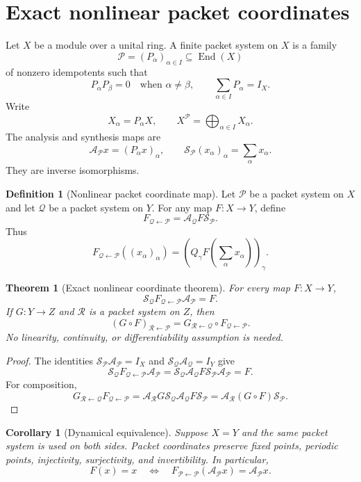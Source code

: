 \documentclass[11pt,a4paper]{article}
\newtheorem{theorem}{Theorem}[section]
\theoremstyle{plain}
\newtheorem{corollary}[corollary]{Corollary}
\theoremstyle{definition}
\newtheorem{definition}[definition]{Definition}
\theoremstyle{remark}
\newcommand{\End}{\operatorname{End}}
\newcommand{\Acal}{\mathcal A}
\newcommand{\Pcal}{\mathcal P}
\newcommand{\Qcal}{\mathcal Q}
\newcommand{\Rcal}{\mathcal R}
\newcommand{\Scal}{\mathcal S}
\begin{document}
\section{Exact nonlinear packet coordinates}\label{sec:nonlinear_coordinates}

Let $X$ be a module over a unital ring.  A finite packet system on $X$ is a family
\[
\Pcal=(P_\alpha)_{\alpha\in I}\subseteq\End(X)
\]
of nonzero idempotents such that
\[
P_\alpha P_\beta=0
\quad\text{when }\alpha\ne\beta,
\qquad
\sum_{\alpha\in I}P_\alpha=I_X.
\]
Write
\[
X_\alpha=P_\alpha X,
\qquad
X^{\Pcal}=\bigoplus_{\alpha\in I}X_\alpha.
\]
The analysis and synthesis maps are
\[
\Acal_{\Pcal}x=(P_\alpha x)_\alpha,
\qquad
\Scal_{\Pcal}(x_\alpha)_\alpha=\sum_\alpha x_\alpha.
\]
They are inverse isomorphisms.

\begin{definition}[Nonlinear packet coordinate map]\label{def:nonlinear_packet_map}
Let $\Pcal$ be a packet system on $X$ and let $\Qcal$ be a packet system on $Y$.  For any map $F:X\to Y$, define
\[
F_{\Qcal\leftarrow\Pcal}
=
\Acal_{\Qcal}F\Scal_{\Pcal}.
\]
Thus
\[
F_{\Qcal\leftarrow\Pcal}((x_\alpha)_\alpha)
=
\left(
Q_\gamma F\left(\sum_\alpha x_\alpha\right)
\right)_\gamma.
\]
\end{definition}

\begin{theorem}[Exact nonlinear coordinate theorem]\label{thm:exact_nonlinear_coordinates}
For every map $F:X\to Y$,
\[
\Scal_{\Qcal}F_{\Qcal\leftarrow\Pcal}\Acal_{\Pcal}=F.
\]
If $G:Y\to Z$ and $\Rcal$ is a packet system on $Z$, then
\[
(G\circ F)_{\Rcal\leftarrow\Pcal}
=
G_{\Rcal\leftarrow\Qcal}
\circ
F_{\Qcal\leftarrow\Pcal}.
\]
No linearity, continuity, or differentiability assumption is needed.
\end{theorem}

\begin{proof}
The identities $\Scal_{\Pcal}\Acal_{\Pcal}=I_X$ and $\Scal_{\Qcal}\Acal_{\Qcal}=I_Y$ give
\[
\Scal_{\Qcal}F_{\Qcal\leftarrow\Pcal}\Acal_{\Pcal}
=
\Scal_{\Qcal}\Acal_{\Qcal}F\Scal_{\Pcal}\Acal_{\Pcal}
=F.
\]
For composition,
\[
G_{\Rcal\leftarrow\Qcal}F_{\Qcal\leftarrow\Pcal}
=
\Acal_{\Rcal}G\Scal_{\Qcal}\Acal_{\Qcal}F\Scal_{\Pcal}
=
\Acal_{\Rcal}(G\circ F)\Scal_{\Pcal}.
\]
\end{proof}

\begin{corollary}[Dynamical equivalence]\label{cor:dynamical_equivalence}
Suppose $X=Y$ and the same packet system is used on both sides.  Packet coordinates preserve fixed points, periodic points, injectivity, surjectivity, and invertibility.  In particular,
\[
F(x)=x
\quad\Longleftrightarrow\quad
F_{\Pcal\leftarrow\Pcal}(\Acal_{\Pcal}x)=\Acal_{\Pcal}x.
\]
\end{corollary}
\end{document}
